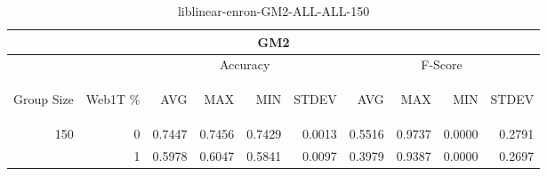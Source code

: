 \begin{center}
\begin{table}[htbp]
\begin{tabular}{ | r | r | r | r | r | r | r | r | r | r |}
\hline
\multicolumn{10}{|c|}{GM2}\\
\hline
 & & \multicolumn{4}{|c|}{Accuracy} & \multicolumn{4}{|c|}{F-Score}\\ \cline{3-10}
\begin{sideways}Group Size\end{sideways} & \begin{sideways}Web1T \%\end{sideways} & \begin{sideways}AVG\end{sideways} & \begin{sideways}MAX\end{sideways} & \begin{sideways}MIN\end{sideways} & \begin{sideways}STDEV\end{sideways} & \begin{sideways}AVG\end{sideways} & \begin{sideways}MAX\end{sideways} & \begin{sideways}MIN\end{sideways} & \begin{sideways}STDEV\end{sideways}\\
\hline
\multirow{1}{*}{150}
 & 0 & 0.7447 & 0.7456 & 0.7429 & 0.0013 & 0.5516 & 0.9737 & 0.0000 & 0.2791\\ \cline{2-10}
 & 1 & 0.5978 & 0.6047 & 0.5841 & 0.0097 & 0.3979 & 0.9387 & 0.0000 & 0.2697\\ \cline{2-10}
\hline
\end{tabular}
\caption{liblinear-enron-GM2-ALL-ALL-150}
\label{table:liblinear-enron-GM2-ALL-ALL-150}
\end{table}
\end{center}

